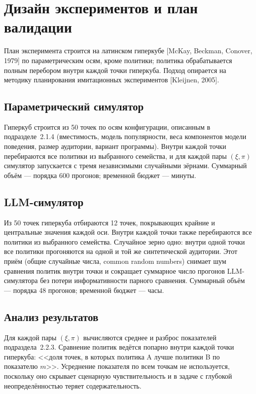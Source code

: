 \section{Дизайн экспериментов и план валидации}

План эксперимента строится на латинском гиперкубе [McKay, Beckman, Conover, 1979] по параметрическим осям, кроме политики; политика обрабатывается полным перебором внутри каждой точки гиперкуба. Подход опирается на методику планирования имитационных экспериментов [Kleijnen, 2005].


\subsection{Параметрический симулятор}

Гиперкуб строится из 50 точек по осям конфигурации, описанным в подразделе~2.1.4 (вместимость, модель популярности, веса компонентов модели поведения, размер аудитории, вариант программы). Внутри каждой точки перебираются все политики из выбранного семейства, и для каждой пары $(\xi, \pi)$ симулятор запускается с тремя независимыми случайными зёрнами. Суммарный объём --- порядка 600 прогонов; временной бюджет --- минуты.


\subsection{LLM-симулятор}

Из 50 точек гиперкуба отбираются 12 точек, покрывающих крайние и центральные значения каждой оси. Внутри каждой точки также перебираются все политики из выбранного семейства. Случайное зерно одно: внутри одной точки все политики прогоняются на одной и той же синтетической аудитории. Этот приём (общие случайные числа, common random numbers) снимает шум сравнения политик внутри точки и сокращает суммарное число прогонов LLM-симулятора без потери информативности парного сравнения. Суммарный объём --- порядка 48 прогонов; временной бюджет --- часы.


\subsection{Анализ результатов}

Для каждой пары $(\xi, \pi)$ вычисляются среднее и разброс показателей подраздела~2.2.3. Сравнение политик ведётся попарно внутри каждой точки гиперкуба: <<доля точек, в которых политика A лучше политики B по показателю $m$>>. Усреднение показателя по всем точкам не используется, поскольку оно скрывает сценарную чувствительность и в задаче с глубокой неопределённостью теряет содержательность.

